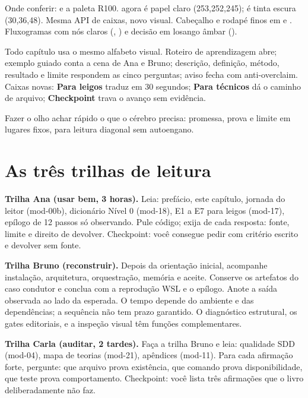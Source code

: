 \begin{paratecnico}
Onde conferir:  e a paleta R100.  agora é papel claro (253,252,245);  é tinta escura (30,36,48). Mesma API de caixas, novo visual. Cabeçalho e rodapé finos em  e . Fluxogramas com nós claros (, ) e decisão em losango âmbar ().
\end{paratecnico}


\begin{descricao}
Todo capítulo usa o mesmo alfabeto visual. Roteiro de aprendizagem abre; exemplo guiado conta a cena de Ana e Bruno; descrição, definição, método, resultado e limite respondem as cinco perguntas; aviso fecha com anti-overclaim. Caixas novas: \textbf{Para leigos} traduz em 30 segundos; \textbf{Para técnicos} dá o caminho de arquivo; \textbf{Checkpoint} trava o avanço sem evidência.
\end{descricao}

\begin{funcao}
Fazer o olho achar rápido o que o cérebro precisa: promessa, prova e limite em lugares fixos, para leitura diagonal sem autoengano.
\end{funcao}

\section{As três trilhas de leitura}


\begin{descricao}
\textbf{Trilha Ana (usar bem, 3 horas).} Leia: prefácio, este capítulo, jornada do leitor (mod-00b), dicionário Nível 0 (mod-18), E1 a E7 para leigos (mod-17), epílogo de 12 passos só observando. Pule código; exija de cada resposta: fonte, limite e direito de devolver. Checkpoint: você consegue pedir com critério escrito e devolver sem fonte.

\textbf{Trilha Bruno (reconstruir).} Depois da orientação inicial, acompanhe
instalação, arquitetura, orquestração, memória e aceite. Conserve os artefatos do
caso condutor e conclua com a reprodução WSL e o epílogo. Anote a saída observada
ao lado da esperada. O tempo depende do ambiente e das dependências; a sequência
não tem prazo garantido. O diagnóstico estrutural, os gates editoriais,
 e a inspeção visual têm funções complementares.

\textbf{Trilha Carla (auditar, 2 tardes).} Faça a trilha Bruno e leia: qualidade SDD (mod-04), mapa de teorias (mod-21), apêndices (mod-11). Para cada afirmação forte, pergunte: que arquivo prova existência, que comando prova disponibilidade, que teste prova comportamento. Checkpoint: você lista três afirmações que o livro deliberadamente não faz.
\end{descricao}

